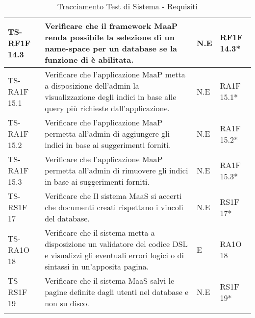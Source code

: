 \begin{center}
\begin{longtable}{| p{3cm} | p{6cm} | p{1.5cm} | p{2cm} | }
				TS-RF1F 14.3 & 
				Verificare che il framework MaaP renda possibile la selezione di un name-space per un database se la funzione di \glossario{namespace} è abilitata. & N.E & RF1F 14.3*  \newline  \\ \hline 
				TS-RA1F 15.1 & 
				Verificare che l’applicazione MaaP metta a disposizione dell’admin la visualizzazione degli indici in base alle query più richieste dall’applicazione. & N.E & RA1F 15.1*  \newline  \\ \hline 
				TS-RA1F 15.2 & 
				Verificare che l’applicazione MaaP permetta all’admin di aggiungere gli indici in base ai suggerimenti forniti. & N.E & RA1F 15.2*  \newline  \\ \hline 
				TS-RA1F 15.3 & 
				Verificare che l’applicazione MaaP permetta all’admin di rimuovere gli indici in base ai suggerimenti forniti. & N.E & RA1F 15.3*  \newline  \\ \hline 
				TS-RS1F 17 & 
				Verificare che Il sistema MaaS si accerti che documenti creati rispettano i vincoli del database. & N.E & RS1F 17*  \newline  \\ \hline 
				TS-RA1O 18 & 
				Verificare che il sistema metta a disposizione un validatore del codice DSL e visualizzi gli eventuali errori logici o di sintassi in un'apposita pagina. & E & RA1O 18 \newline  \\ \hline 
				TS-RS1F 19 & 
				Verificare che il sistema MaaS salvi le pagine definite dagli utenti nel database e non su disco. & N.E & RS1F 19*  \newline  \\ \hline 
		\caption{Tracciamento Test di Sistema - Requisiti}
		\end{longtable}
	 \egroup
\end{center}